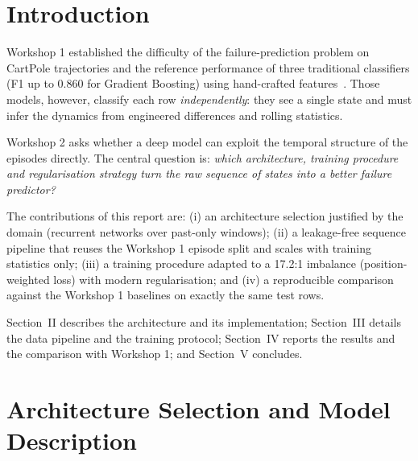 \documentclass[conference]{IEEEtran}
\begin{document}
\section{Introduction}
Workshop 1 established the difficulty of the failure-prediction problem on
CartPole trajectories and the reference performance of three traditional
classifiers (F1 up to 0.860 for Gradient Boosting) using hand-crafted
features~\cite{barto1983}. Those models, however, classify each row
\emph{independently}: they see a single state and must infer the dynamics
from engineered differences and rolling statistics.

Workshop 2 asks whether a deep model can exploit the temporal structure of
the episodes directly. The central question is: \emph{which architecture,
training procedure and regularisation strategy turn the raw sequence of states
into a better failure predictor?}

The contributions of this report are: (i) an architecture selection justified
by the domain (recurrent networks over past-only windows); (ii) a
leakage-free sequence pipeline that reuses the Workshop 1 episode split and
scales with training statistics only; (iii) a training procedure adapted to a
17.2:1 imbalance (position-weighted loss) with modern regularisation; and
(iv) a reproducible comparison against the Workshop 1 baselines on exactly the
same test rows.

Section~II describes the architecture and its implementation;
Section~III details the data pipeline and the training protocol;
Section~IV reports the results and the comparison with Workshop 1; and
Section~V concludes.

\section{Architecture Selection and Model Description}
\end{document}
